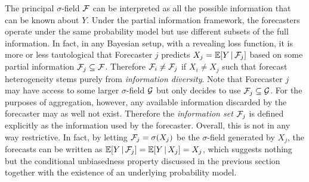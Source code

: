\documentclass[11pt]{article}
\newcommand{\E}{\mathbb{E}}
\theoremstyle{definition}
\theoremstyle{definition}
\def\F{{\cal F}}
\def\G{{\cal G}}
\def\E{{\mathbb E}}
\def\|{\, | \,}
\begin{document}



The principal $\sigma$-field $\F$ can be interpreted as all the possible information that can be known about $Y$. Under the partial information framework, the forecasters operate under the same probability model but use different subsets of the full information. In fact, in any Bayesian setup, with a revealing loss function, it is more or less tautological that
Forecaster $j$ predicts $X_j = \E[Y \| \F_j]$ based on some partial information $\F_j \subseteq \F$. Therefore $\F_i \neq \F_j$ if $X_i \neq X_j$ such that forecast heterogeneity stems purely from \textit{information diversity}. 
 Note that Forecaster $j$ may have access to some larger $\sigma$-field $\G$ but only decides to use $\F_j \subseteq \G$. For the purposes of aggregation, however, any available information discarded by the forecaster may as well not exist. Therefore the \textit{information set} $\F_j$ is defined explicitly as the information used by the forecaster. 
 Overall, this is not in any way restrictive. In fact, by letting $\F_j = \sigma(X_j)$ be the $\sigma$-field generated by $X_j$, the forecasts can be written as $ \E[Y \| \F_j] =  \E[Y \| X_j] = X_j$, which suggests nothing but the conditional unbiasedness property discussed in the previous section together with the existence of an underlying probability model. 
 
\end{document}
